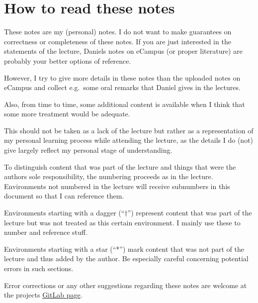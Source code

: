 \section{How to read these notes}
\label{sec:how-to-read}

These notes are my (personal) notes.
I do not want to make guarantees on correctness or completeness
of these notes.
If you are just interested in the statements of the lecture,
Daniels notes on eCampus (or proper literature)
are probably your better options of reference.

However, I try to give more details in these notes than the uploaded
notes on eCampus and collect e.g.~some oral remarks that Daniel gives
in the lectures.

Also, from time to time, some additional content is available when I
think that some more treatment would be adequate.

This should not be taken as a lack of the lecture but rather as
a representation of my personal learning process while attending the
lecture, as the details I do (not) give largely reflect my personal
stage of understanding.

To distinguish content that was part of the lecture and things that
were the authors sole responsibility, the numbering proceeds as in
the lecture.
Environments not numbered in the lecture will receive
subnumbers in this document so that I can reference them.

Environments starting with a dagger (\enquote{$\dagger$})
represent content that was part of the lecture but was not
treated as this certain environment.
I mainly use these to number and reference stuff.

Environments starting with a star (\enquote{*})
mark content that was not part of the lecture and thus added
by the author.
Be especially careful concerning potential errors in such sections.

Error corrections or any other suggestions regarding these notes are welcome
at the projects
\href{https://gitlab.com/latexci/lecture-notes-bonn/topology-2}{GitLab page}.

